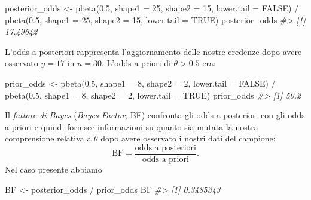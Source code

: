 \documentclass[
  11pt,
  italian,
  a4paper,
  extrafontsizes,onecolumn,openright
  ]{memoir}
\newenvironment{Shaded}{\begin{snugshade}}{\end{snugshade}}
\newcommand{\AttributeTok}[1]{\textcolor[rgb]{0.77,0.63,0.00}{#1}}
\newcommand{\CommentTok}[1]{\textcolor[rgb]{0.56,0.35,0.01}{\textit{#1}}}
\newcommand{\ConstantTok}[1]{\textcolor[rgb]{0.00,0.00,0.00}{#1}}
\newcommand{\DecValTok}[1]{\textcolor[rgb]{0.00,0.00,0.81}{#1}}
\newcommand{\FloatTok}[1]{\textcolor[rgb]{0.00,0.00,0.81}{#1}}
\newcommand{\FunctionTok}[1]{\textcolor[rgb]{0.00,0.00,0.00}{#1}}
\newcommand{\NormalTok}[1]{#1}
\newcommand{\OtherTok}[1]{\textcolor[rgb]{0.56,0.35,0.01}{#1}}
\newcommand{\SpecialCharTok}[1]{\textcolor[rgb]{0.00,0.00,0.00}{#1}}
\begin{document}
\begin{Shaded}
\begin{Highlighting}[]
\NormalTok{posterior\_odds }\OtherTok{\textless{}{-}}
  \FunctionTok{pbeta}\NormalTok{(}\FloatTok{0.5}\NormalTok{, }\AttributeTok{shape1 =} \DecValTok{25}\NormalTok{, }\AttributeTok{shape2 =} \DecValTok{15}\NormalTok{, }\AttributeTok{lower.tail =} \ConstantTok{FALSE}\NormalTok{) }\SpecialCharTok{/}
    \FunctionTok{pbeta}\NormalTok{(}\FloatTok{0.5}\NormalTok{, }\AttributeTok{shape1 =} \DecValTok{25}\NormalTok{, }\AttributeTok{shape2 =} \DecValTok{15}\NormalTok{, }\AttributeTok{lower.tail =} \ConstantTok{TRUE}\NormalTok{)}
\NormalTok{posterior\_odds}
\CommentTok{\#\textgreater{} [1] 17.49642}
\end{Highlighting}
\end{Shaded}

\noindent
L'odds a posteriori rappresenta l'aggiornamento delle nostre credenze dopo avere osservato \(y = 17\) in \(n = 30\). L'odds a priori di \(\theta > 0.5\) era:

\begin{Shaded}
\begin{Highlighting}[]
\NormalTok{prior\_odds }\OtherTok{\textless{}{-}}
  \FunctionTok{pbeta}\NormalTok{(}\FloatTok{0.5}\NormalTok{, }\AttributeTok{shape1 =} \DecValTok{8}\NormalTok{, }\AttributeTok{shape2 =} \DecValTok{2}\NormalTok{, }\AttributeTok{lower.tail =} \ConstantTok{FALSE}\NormalTok{) }\SpecialCharTok{/}
    \FunctionTok{pbeta}\NormalTok{(}\FloatTok{0.5}\NormalTok{, }\AttributeTok{shape1 =} \DecValTok{8}\NormalTok{, }\AttributeTok{shape2 =} \DecValTok{2}\NormalTok{, }\AttributeTok{lower.tail =} \ConstantTok{TRUE}\NormalTok{)}
\NormalTok{prior\_odds}
\CommentTok{\#\textgreater{} [1] 50.2}
\end{Highlighting}
\end{Shaded}

Il \emph{fattore di Bayes} (\emph{Bayes Factor}; BF) confronta gli odds a posteriori con gli odds a priori e quindi fornisce informazioni su quanto sia mutata la nostra comprensione relativa a \(\theta\) dopo avere osservato i nostri dati del campione:
\[
\text{BF} = \frac{\text{odds a posteriori}}{\text{odds a priori}}.
\]
Nel caso presente abbiamo

\begin{Shaded}
\begin{Highlighting}[]
\NormalTok{BF }\OtherTok{\textless{}{-}}\NormalTok{ posterior\_odds }\SpecialCharTok{/}\NormalTok{ prior\_odds}
\NormalTok{BF}
\CommentTok{\#\textgreater{} [1] 0.3485343}
\end{Highlighting}
\end{Shaded}
\end{document}
